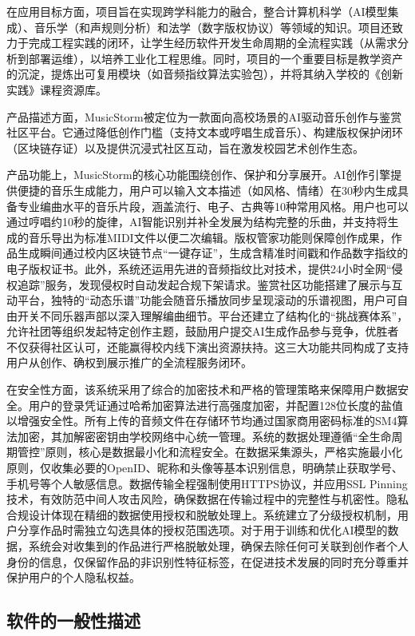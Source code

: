 \documentclass{base}
\numberwithin{figure}{section} %
\begin{document}
在应用目标方面，项目旨在实现跨学科能力的融合，整合计算机科学（AI模型集成）、音乐学（和声规则分析）和法学（数字版权协议）等领域的知识。项目还致力于完成工程实践的闭环，让学生经历软件开发生命周期的全流程实践（从需求分析到部署运维），以培养工业化工程思维。同时，项目的一个重要目标是教学资产的沉淀，提炼出可复用模块（如音频指纹算法实验包），并将其纳入学校的《创新实践》课程资源库。

产品描述方面，MusicStorm被定位为一款面向高校场景的AI驱动音乐创作与鉴赏社区平台。它通过降低创作门槛（支持文本或哼唱生成音乐）、构建版权保护闭环（区块链存证）以及提供沉浸式社区互动，旨在激发校园艺术创作生态。

产品功能上，MusicStorm的核心功能围绕创作、保护和分享展开。AI创作引擎提供便捷的音乐生成能力，用户可以输入文本描述（如风格、情绪）在30秒内生成具备专业编曲水平的音乐片段，涵盖流行、电子、古典等10种常用风格。用户也可以通过哼唱约10秒的旋律，AI智能识别并补全发展为结构完整的乐曲，并支持将生成的音乐导出为标准MIDI文件以便二次编辑。版权管家功能则保障创作成果，作品生成瞬间通过校内区块链节点“一键存证”，生成含精准时间戳和作品数字指纹的电子版权证书。此外，系统还运用先进的音频指纹比对技术，提供24小时全网“侵权追踪”服务，发现侵权时自动发起合规下架请求。鉴赏社区功能搭建了展示与互动平台，独特的“动态乐谱”功能会随音乐播放同步呈现滚动的乐谱视图，用户可自由开关不同乐器声部以深入理解编曲细节。平台还建立了结构化的“挑战赛体系”，允许社团等组织发起特定创作主题，鼓励用户提交AI生成作品参与竞争，优胜者不仅获得社区认可，还能赢得校内线下演出资源扶持。这三大功能共同构成了支持用户从创作、确权到展示推广的全流程服务闭环。

在安全性方面，该系统采用了综合的加密技术和严格的管理策略来保障用户数据安全。用户的登录凭证通过哈希加密算法进行高强度加密，并配置128位长度的盐值以增强安全性。所有上传的音频文件在存储环节均通过国家商用密码标准的SM4算法加密，其加解密密钥由学校网络中心统一管理。系统的数据处理遵循“全生命周期管控”原则，核心是数据最小化和流程安全。在数据采集源头，严格实施最小化原则，仅收集必要的OpenID、昵称和头像等基本识别信息，明确禁止获取学号、手机号等个人敏感信息。数据传输全程强制使用HTTPS协议，并应用SSL Pinning技术，有效防范中间人攻击风险，确保数据在传输过程中的完整性与机密性。隐私合规设计体现在精细的数据使用授权和脱敏处理上。系统建立了分级授权机制，用户分享作品时需独立勾选具体的授权范围选项。对于用于训练和优化AI模型的数据，系统会对收集到的作品进行严格脱敏处理，确保去除任何可关联到创作者个人身份的信息，仅保留作品的非识别性特征标签，在促进技术发展的同时充分尊重并保护用户的个人隐私权益。

\subsection{软件的一般性描述}
\end{document}
